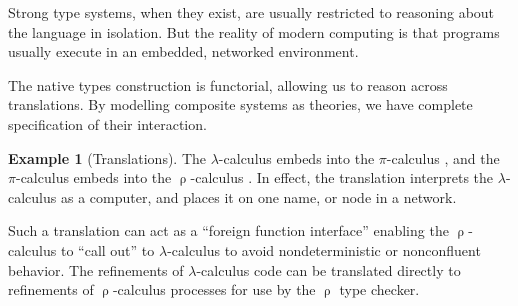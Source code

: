 \documentclass[conference]{IEEEtran}
\theoremstyle{definition}
\newtheorem{example}[theorem]{Example}
\begin{document}
Strong type systems, when they exist, are usually restricted to reasoning about the language in isolation. But the reality of modern computing is that programs usually execute in an embedded, networked environment.

The native types construction is functorial, allowing us to reason across translations. By modelling composite systems as theories, we have complete specification of their interaction.

\begin{example}[Translations]
The $\lambda$-calculus embeds into the $\pi$-calculus \cite{pical}, and the $\pi$-calculus embeds into the $\uprho$-calculus \cite{rhocal}. In effect, the translation interprets the $\lambda$-calculus as a computer, and places it on one name, or node in a network.

Such a translation can act as a ``foreign function interface'' enabling the $\uprho$-calculus to ``call out'' to $\lambda$-calculus to avoid nondeterministic or nonconfluent behavior.  The refinements of $\lambda$-calculus code can be translated directly to refinements of $\uprho$-calculus processes for use by the $\uprho$ type checker.
\end{example}
\end{document}
